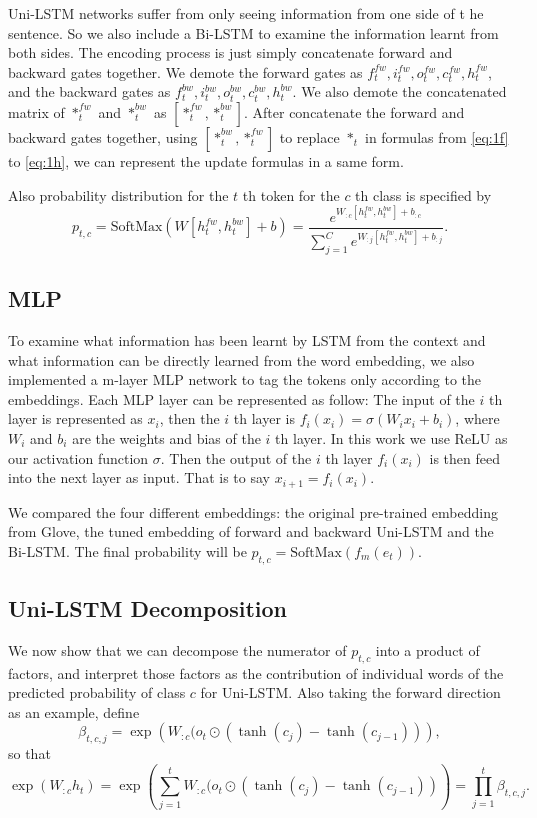 \documentclass{article}
\begin{document}
Uni-LSTM networks suffer from only seeing information from one side of t he sentence. So we also include a Bi-LSTM to examine the information learnt from both sides. The encoding process is just simply concatenate forward and backward gates together. We demote the forward gates as $f_t^{fw}, i_t^{fw}, o_t^{fw}, c_t^{fw}, h_t^{fw}$, and the backward gates as $f_t^{bw}, i_t^{bw}, o_t^{bw}, c_t^{bw}, h_t^{bw}$. We also demote the concatenated matrix of $*_t^{fw}$ and $*_t^{bw}$ as $[*_t^{fw}, *_t^{bw}]$. After concatenate the forward and backward gates together, using $[*_t^{bw}, *_t^{fw}]$ to replace $*_t$ in formulas from \ref{eq:1f} to \ref{eq:1h}, we can represent the update formulas in a same form. 

Also probability distribution for the $t$ th token for the $c$ th class is specified by 
\begin{equation}
p_{t, c} = \text{SoftMax}(W [h_t^{fw}, h_t^{bw}] + b) = \frac{e^{W_{:c} [h_t^{fw}, h_t^{bw}] + b_{:c}}}{\sum_{j = 1} ^ C e^{W_{:j} [h_t^{fw}, h_t^{bw}] + b_{:j}}}.
\end{equation}


\subsection{MLP}

To examine what information has been learnt by LSTM from the context and what information can be directly learned from the word embedding, we also implemented a m-layer MLP network to tag the tokens only according to the embeddings. Each MLP layer can be represented as follow:
The input of the $i$ th layer is represented as $x_i$, then the $i$ th layer is $f_i(x_i) = \sigma(W_i x_i + b_i)$, where $W_i$ and $b_i$ are the weights and bias of the $i$ th layer. In this work we use ReLU as our activation function $\sigma$. Then the output of the $i$ th layer $f_i(x_i)$ is then feed into the next layer as input. That is to say $x_{i+1} = f_i(x_i)$. 

We compared the four different embeddings: the original pre-trained embedding from Glove, the tuned embedding of forward and backward Uni-LSTM and the Bi-LSTM. The final probability will be $p_{t, c} = \text{SoftMax}(f_m(e_t))$.%

\subsection{Uni-LSTM Decomposition}

We now show that we can decompose the numerator of $p_{t, c}$ into a product of factors, and interpret those factors as the contribution of individual words of the predicted probability of class $c$ for Uni-LSTM. Also taking the forward direction as an example, define 
\begin{equation}\label{eq:uni-beta} 
\beta_{t, c, j} = \exp\left(W_{:c} (o_t \odot (\tanh(c_j)- \tanh(c_{j-1}))\right),
\end{equation}
so that 
\[\exp( W_{:c} h_t) = \exp\left(\sum_{j=1}^t W_{:c} (o_t \odot (\tanh(c_j) - \tanh(c_{j-1}))\right) = \prod_{j=1}^t \beta_{t, c, j}.\]
\end{document}

